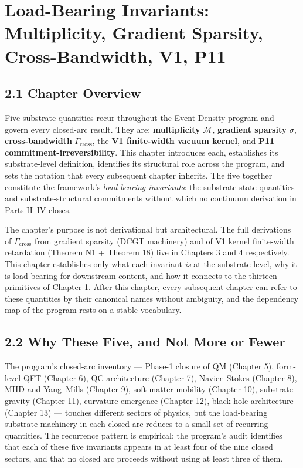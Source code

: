 \documentclass[11pt]{book}
\begin{document}
\newpage


\chapter{Load-Bearing Invariants: Multiplicity, Gradient Sparsity, Cross-Bandwidth, V1, P11}
\label{chap:2}

\section{2.1 Chapter Overview}

Five substrate quantities recur throughout the Event Density program and govern every closed-arc result. They are: \textbf{multiplicity} $\mathcal{M}$, \textbf{gradient sparsity} $\sigma$, \textbf{cross-bandwidth} $\Gamma_\mathrm{cross}$, the \textbf{V1 finite-width vacuum kernel}, and \textbf{P11 commitment-irreversibility}. This chapter introduces each, establishes its substrate-level definition, identifies its structural role across the program, and sets the notation that every subsequent chapter inherits. The five together constitute the framework's \textit{load-bearing invariants}: the substrate-state quantities and substrate-structural commitments without which no continuum derivation in Parts II–IV closes.

The chapter's purpose is not derivational but architectural. The full derivations of $\Gamma_\mathrm{cross}$ from gradient sparsity (DCGT machinery) and of V1 kernel finite-width retardation (Theorem N1 + Theorem 18) live in Chapters 3 and 4 respectively. This chapter establishes only what each invariant \textit{is} at the substrate level, why it is load-bearing for downstream content, and how it connects to the thirteen primitives of Chapter 1. After this chapter, every subsequent chapter can refer to these quantities by their canonical names without ambiguity, and the dependency map of the program rests on a stable vocabulary.

\section{2.2 Why These Five, and Not More or Fewer}

The program's closed-arc inventory — Phase-1 closure of QM (Chapter 5), form-level QFT (Chapter 6), QC architecture (Chapter 7), Navier–Stokes (Chapter 8), MHD and Yang–Mills (Chapter 9), soft-matter mobility (Chapter 10), substrate gravity (Chapter 11), curvature emergence (Chapter 12), black-hole architecture (Chapter 13) — touches different sectors of physics, but the load-bearing substrate machinery in each closed arc reduces to a small set of recurring quantities. The recurrence pattern is empirical: the program's audit identifies that each of these five invariants appears in at least four of the nine closed sectors, and that no closed arc proceeds without using at least three of them.
\end{document}
